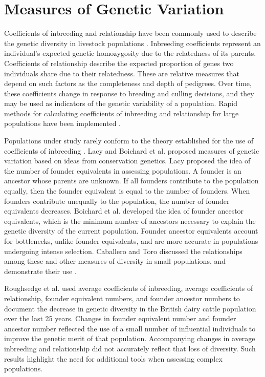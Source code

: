 \section{Measures of Genetic Variation}
\label{sec:methodology-genetic-variation}
Coefficients of inbreeding and relationship \cite{Wright1922} have been commonly used to describe the genetic diversity in livestock populations \cite{ref351}.  Inbreeding coefficients represent an individual's expected genetic homozygosity due to the relatedness of its parents. Coefficients of relationship describe the expected proportion of genes two individuals share due to their relatedness. These are relative measures that depend on such factors as the completeness and depth of pedigrees. Over time, these coefficients change in response to breeding and culling decisions, and they may be used as indicators of the genetic variability of a population. Rapid methods for calculating coefficients of inbreeding and relationship for large populations have been implemented \cite{ref337}.

Populations under study rarely conform to the theory established for the use of coefficients of inbreeding \cite{Wright1931}. Lacy \citeyear{ref640} and Boichard et al. \citeyear{ref352} proposed measures of genetic variation based on ideas from conservation genetics. Lacy \citeyear{ref640} proposed the idea of the number of founder equivalents in assessing populations. A founder is an ancestor whose parents are unknown. If all founders contribute to the population equally, then the founder equivalent is equal to the number of founders. When founders contribute unequally to the population, the number of founder equivalents decreases. Boichard et al. \citeyear{ref352} developed the idea of founder ancestor equivalents, which is the minimum number of ancestors necessary to explain the genetic diversity of the current population. Founder ancestor equivalents account for bottlenecks, unlike founder equivalents, and are more accurate in populations undergoing intense selection.  Caballero and Toro \citeyear{ref817} discussed the relationships among these and other measures of diversity in small populations, and demonstrate their use \cite{ref435}.

Roughsedge et al. \citeyear{ref641} used average coefficients of inbreeding, average coefficients of relationship, founder equivalent numbers, and founder ancestor numbers to document the decrease in genetic diversity in the British dairy cattle population over the last 25 years. Changes in founder equivalent number and founder ancestor number reflected the use of a small number of influential individuals to improve the genetic merit of that population. Accompanying changes in average inbreeding and relationship did not accurately reflect that loss of diversity. Such results highlight the need for additional tools when assessing complex populations.
